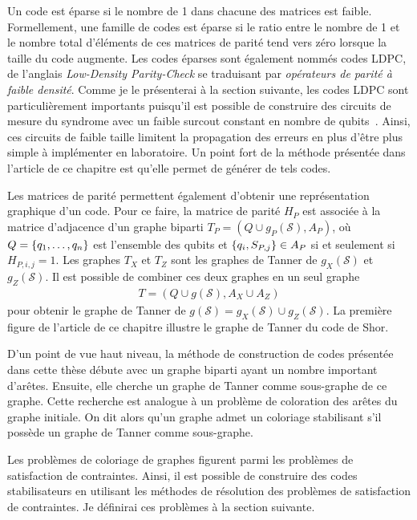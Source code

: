Un code est éparse si le nombre de 1 dans chacune des matrices est faible.
Formellement,
une famille de codes est éparse si le ratio entre le nombre de 1 
et le nombre total d'éléments de ces matrices de parité tend vers zéro 
lorsque la taille du code augmente.
Les codes éparses sont également nommés codes LDPC,
de l'anglais \textit{Low-Density Parity-Check} se traduisant par
\textit{opérateurs de parité à faible densité}.
Comme je le présenterai à la section suivante,
les codes LDPC sont particulièrement importants puisqu'il est possible de construire
des circuits de mesure du syndrome avec un faible surcout
constant en nombre de qubits~\cite{gottesman_fault-tolerant_2013}.
Ainsi,
ces circuits de faible taille limitent la propagation des erreurs en plus d'être plus simple à 
implémenter en laboratoire.
Un point fort de la méthode présentée dans l'article de ce chapitre est qu'elle permet 
de générer de tels codes.

Les matrices de parité permettent également d'obtenir une représentation graphique d'un code.
Pour ce faire, la matrice de parité $H_P$ est associée à la matrice d'adjacence d'un
graphe biparti $T_P = (Q \cup g_P(\mathcal S), A_P)$,
où $Q = \qty{q_1, \dots, q_n}$ est l'ensemble des qubits
et $\qty{q_i, S_{P, j}} \in A_P$ si et seulement si $H_{P, i, j} = 1$.
Les graphes $T_X$ et $T_Z$ sont les graphes de Tanner de $g_X(\mathcal S)$ et $g_Z(\mathcal S)$.
Il est possible de combiner ces deux graphes en un seul graphe
\begin{align}
  T = (Q \cup g(\mathcal S), A_X \cup A_Z)
\end{align}
pour obtenir le graphe de Tanner de $g(\mathcal S) = g_X(\mathcal S) \cup g_Z(\mathcal S)$.
La première figure de l'article de ce chapitre illustre le graphe de Tanner du code de Shor.

D'un point de vue haut niveau,
la méthode de construction de codes présentée dans cette thèse
débute avec un graphe biparti ayant un nombre important d'arêtes.
Ensuite, elle cherche un graphe de Tanner comme sous-graphe de ce graphe.
Cette recherche est analogue à un problème de coloration des arêtes du graphe initiale.
On dit alors qu'un graphe admet un coloriage stabilisant s'il possède un graphe de Tanner comme sous-graphe.

Les problèmes de coloriage de graphes figurent parmi les problèmes de satisfaction de contraintes.
Ainsi,
il est possible de construire des codes stabilisateurs en utilisant les méthodes 
de résolution des problèmes de satisfaction de contraintes.
Je définirai ces problèmes à la section suivante.

